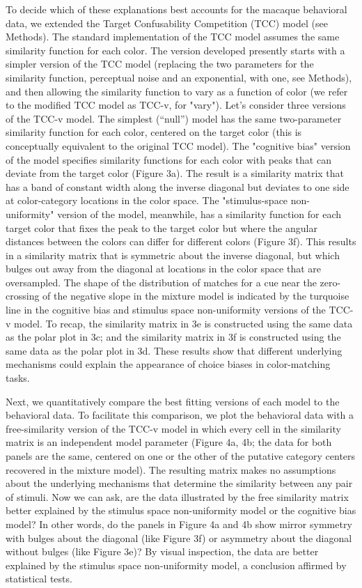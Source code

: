 To decide which of these explanations best accounts for the macaque behavioral data, we extended the Target Confusability Competition (TCC) model \citep{schurgin_psychophysical_2020} (see Methods). 
The standard implementation of the TCC model assumes the same similarity function for each color. The version developed presently starts with a simpler version of the TCC model (replacing the two parameters for the similarity function, perceptual noise and an exponential, with one, see Methods), and then allowing the similarity function to vary as a function of color (we refer to the modified TCC model as TCC-v, for "vary"). Let's consider three versions of the TCC-v model. The simplest (“null”) model has the same two-parameter similarity function for each color, centered on the target color (this is conceptually equivalent to the original TCC model).  
The "cognitive bias" version of the model specifies similarity functions for each color with peaks that can deviate from the target color (Figure 3a). 
The result is a similarity matrix that has a band of constant width along the inverse diagonal but deviates to one side at color-category locations in the color space. 
The "stimulus-space non-uniformity" version of the model, meanwhile, has a similarity function for each target color that fixes the peak to the target color but where the angular distances between the colors can differ for different colors (Figure 3f). 
This results in a similarity matrix that is symmetric about the inverse diagonal, but which bulges out away from the diagonal at locations in the color space that are oversampled. 
The shape of the distribution of matches for a cue near the zero-crossing of the negative slope in the mixture model is indicated by the turquoise line in the cognitive bias and stimulus space non-uniformity versions of the TCC-v model. 
To recap, the similarity matrix in 3e is constructed using the same data as the polar plot in 3c; and the similarity matrix in 3f is constructed using the same data as the polar plot in 3d. 
These results show that different underlying mechanisms could explain the appearance of choice biases in color-matching tasks.

Next, we quantitatively compare the best fitting versions of each model to the behavioral data. 
To facilitate this comparison, we plot the behavioral data with a free-similarity version of the TCC-v model in which every cell in the similarity matrix is an independent model parameter (Figure 4a, 4b; the data for both panels are the same, centered on one or the other of the putative category centers recovered in the mixture model). 
The resulting matrix makes no assumptions about the underlying mechanisms that determine the similarity between any pair of stimuli. 
Now we can ask, are the data illustrated by the free similarity matrix better explained by the stimulus space non-uniformity model or the cognitive bias model? 
In other words, do the panels in Figure 4a and 4b show mirror symmetry with bulges about the diagonal (like Figure 3f) or asymmetry about the diagonal without bulges (like Figure 3e)? By visual inspection, the data are better explained by the stimulus space non-uniformity model, a conclusion affirmed by statistical tests. 

